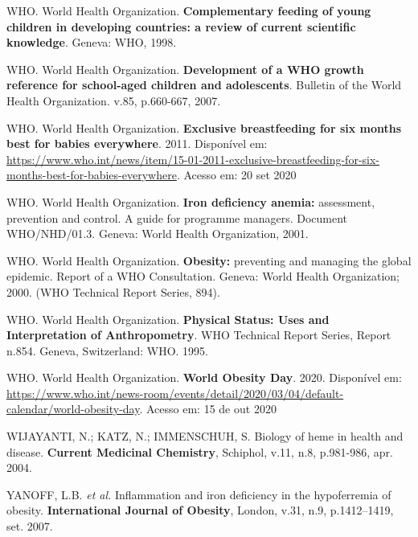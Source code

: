 \bigbreak

\noindent WHO. World Health Organization. \textbf{Complementary feeding of young children in developing countries: a review of current scientific knowledge}. Geneva: WHO, 1998.

\bigbreak

\noindent WHO. World Health Organization. \textbf{Development of a WHO growth reference for school-aged children and adolescents}. Bulletin of the World Health Organization. v.85, p.660-667, 2007. 

\bigbreak

\noindent WHO. World Health Organization. \textbf{Exclusive breastfeeding for six months best for babies everywhere}. 2011. Disponível em: \url{https://www.who.int/news/item/15-01-2011-exclusive-breastfeeding-for-six-months-best-for-babies-everywhere}. Acesso em: 20 set 2020

\bigbreak

\noindent WHO. World Health Organization. \textbf{Iron deficiency anemia:} assessment, prevention and control. A guide for programme managers. Document WHO/NHD/01.3. Geneva: World Health Organization, 2001.

\bigbreak

\noindent WHO. World Health Organization. \textbf{Obesity:} preventing and managing the global epidemic. Report of a WHO Consultation. Geneva: World Health Organization; 2000. (WHO Technical Report Series, 894).

\bigbreak

\noindent WHO. World Health Organization. \textbf{Physical Status: Uses and Interpretation of Anthropometry}. WHO Technical Report Series, Report n.854. Geneva, Switzerland: WHO. 1995.

\noindent WHO. World Health Organization. \textbf{World Obesity Day}. 2020. Disponível em: \url{https://www.who.int/news-room/events/detail/2020/03/04/default-calendar/world-obesity-day}. Acesso em: 15 de out 2020

\bigbreak

\noindent WIJAYANTI, N.; KATZ, N.; IMMENSCHUH, S. Biology of heme in health and disease. \textbf{Current Medicinal Chemistry}, Schiphol, v.11, n.8, p.981-986, apr. 2004.

\bigbreak

\noindent YANOFF, L.B. \textit{et al.} Inflammation and iron deficiency in the hypoferremia of obesity. \textbf{International Journal of Obesity}, London, v.31, n.9, p.1412–1419, set. 2007. 

